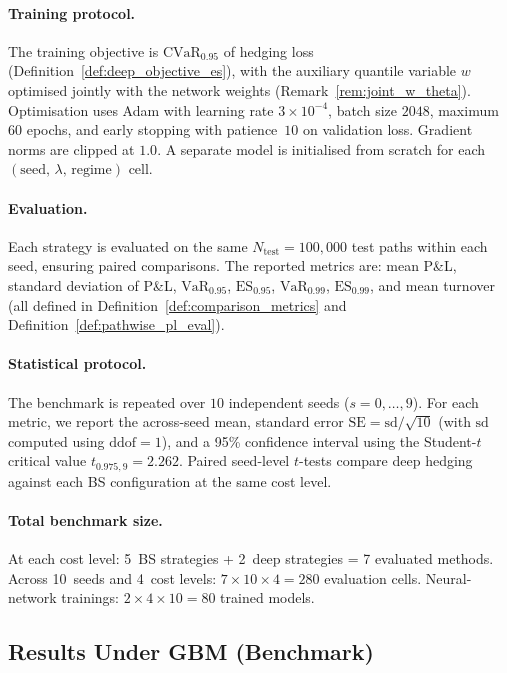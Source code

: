 \documentclass[12pt,a4paper]{article}
\theoremstyle{definition}
\theoremstyle{plain}
\theoremstyle{remark}
\theoremstyle{plain}
\begin{document}
\paragraph{Training protocol.}
The training objective is $\mathrm{CVaR}_{0.95}$ of hedging loss
(Definition~\ref{def:deep_objective_es}),
with the auxiliary quantile variable $w$ optimised jointly with
the network weights (Remark~\ref{rem:joint_w_theta}).
Optimisation uses Adam with learning rate $3 \times 10^{-4}$,
batch size $2048$, maximum $60$ epochs, and early stopping
with patience~$10$ on validation loss.
Gradient norms are clipped at $1.0$.
A separate model is initialised from scratch for each
$(\text{seed},\,\lambda,\,\text{regime})$ cell.
 
\paragraph{Evaluation.}
Each strategy is evaluated on the same $N_{\mathrm{test}} = 100{,}000$
test paths within each seed, ensuring paired comparisons.
The reported metrics are: mean P\&L, standard deviation of P\&L,
$\mathrm{VaR}_{0.95}$, $\mathrm{ES}_{0.95}$,
$\mathrm{VaR}_{0.99}$, $\mathrm{ES}_{0.99}$,
and mean turnover
(all defined in Definition~\ref{def:comparison_metrics}
and Definition~\ref{def:pathwise_pl_eval}).
 
\paragraph{Statistical protocol.}
The benchmark is repeated over $10$ independent seeds
($s = 0,\ldots,9$).
For each metric, we report the across-seed mean, standard error
$\mathrm{SE} = \mathrm{sd}/\!\sqrt{10}$
(with $\mathrm{sd}$ computed using $\mathrm{ddof}=1$), and a 95\% confidence
interval using the Student-$t$ critical value $t_{0.975,9} = 2.262$.
Paired seed-level $t$-tests compare deep hedging against each BS
configuration at the same cost level.
 
\paragraph{Total benchmark size.}
At each cost level: 5~BS strategies + 2~deep strategies = 7 evaluated methods.
Across 10~seeds and 4~cost levels: $7 \times 10 \times 4 = 280$ evaluation cells.
Neural-network trainings: $2 \times 4 \times 10 = 80$ trained models.
 
\subsection{Results Under GBM (Benchmark)}
\label{subsec:results_gbm}
\end{document}
